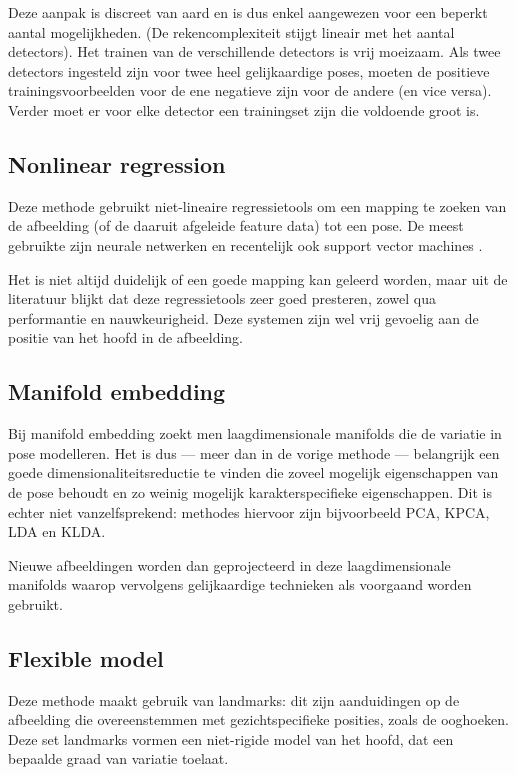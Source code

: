 \documentclass[a4paper,dutch,11pt]{scrartcl}
\begin{document}
Deze aanpak is discreet van aard en is dus enkel aangewezen voor een beperkt aantal mogelijkheden. (De rekencomplexiteit stijgt lineair met het aantal detectors). Het trainen van de verschillende detectors is vrij moeizaam. Als twee detectors ingesteld zijn voor twee heel gelijkaardige poses, moeten de positieve trainingsvoorbeelden voor de ene negatieve zijn voor de andere (en vice versa). Verder moet er voor elke detector een trainingset zijn die voldoende groot is. %

\subsection{Nonlinear regression} 
Deze methode gebruikt niet-lineaire regressietools om een mapping te zoeken van de afbeelding (of de daaruit afgeleide feature data) tot een pose. De meest gebruikte zijn neurale netwerken en recentelijk ook support vector machines \cite{blockeel}. 

Het is niet altijd duidelijk of een goede mapping kan geleerd worden, maar uit de literatuur blijkt dat deze regressietools zeer goed presteren, zowel qua performantie en nauwkeurigheid. Deze systemen zijn wel vrij gevoelig aan de positie van het hoofd in de afbeelding. 

\subsection{Manifold embedding}
Bij manifold embedding zoekt men laagdimensionale manifolds die de variatie in pose modelleren. Het is dus --- meer dan in de vorige methode --- belangrijk een goede dimensionaliteitsreductie te vinden die zoveel mogelijk eigenschappen van de pose behoudt en zo weinig mogelijk karakterspecifieke eigenschappen. Dit is echter niet vanzelfsprekend: methodes hiervoor zijn bijvoorbeeld PCA, KPCA, LDA en KLDA.

Nieuwe afbeeldingen worden dan geprojecteerd in deze laagdimensionale manifolds waarop vervolgens gelijkaardige technieken als voorgaand worden gebruikt.

\subsection{Flexible model}
Deze methode maakt gebruik van landmarks: dit zijn aanduidingen op de afbeelding die overeenstemmen met gezichtspecifieke posities, zoals de ooghoeken. Deze set landmarks vormen een niet-rigide model van het hoofd, dat een bepaalde graad van variatie toelaat.
\end{document}
